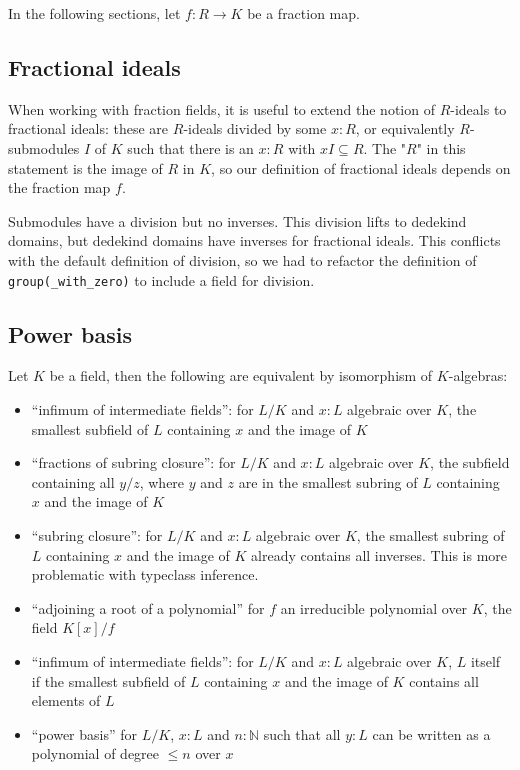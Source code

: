 \documentclass{lipics-v2021}
\newcommand{\lean}[1]{\texttt{#1}\xspace} %
\newcommand{\N}{\mathbb{N}}
\begin{document}
In the following sections, let $f : R \to K$ be a fraction map.

\subsection{Fractional ideals}

When working with fraction fields, it is useful to extend the notion of $R$-ideals to fractional ideals: these are $R$-ideals divided by some $x : R$, or equivalently $R$-submodules $I$ of $K$ such that there is an $x : R$ with $x I \subseteq R$. The "$R$" in this statement is the image of $R$ in $K$, so our definition of fractional ideals depends on the fraction map $f$.

Submodules have a division but no inverses. This division lifts to dedekind domains, but dedekind domains have inverses for fractional ideals. This conflicts with the default definition of division, so we had to refactor the definition of \lean{group(\_with\_zero)} to include a field for division.

\subsection{Power basis}

Let $K$ be a field, then the following are equivalent by isomorphism of $K$-algebras:
\begin{itemize}
 \item ``infimum of intermediate fields'': for $L / K$ and $x : L$ algebraic over $K$, the smallest subfield of $L$ containing $x$ and the image of $K$
 \item ``fractions of subring closure'': for $L / K$ and $x : L$ algebraic over $K$, the subfield containing all $y / z$, where $y$ and $z$ are in the smallest subring of $L$ containing $x$ and the image of $K$
 \item ``subring closure'': for $L / K$ and $x : L$ algebraic over $K$, the smallest subring of $L$ containing $x$ and the image of $K$ already contains all inverses. This is more problematic with typeclass inference.
 \item ``adjoining a root of a polynomial'' for $f$ an irreducible polynomial over $K$, the field $K[x] / f$
 \item ``infimum of intermediate fields'': for $L / K$ and $x : L$ algebraic over $K$, $L$ itself if the smallest subfield of $L$ containing $x$ and the image of $K$ contains all elements of $L$
 \item ``power basis'' for $L / K$, $x : L$ and $n : \N$ such that all $y : L$ can be written as a polynomial of degree $\le n$ over $x$
\end{itemize}
\end{document}
